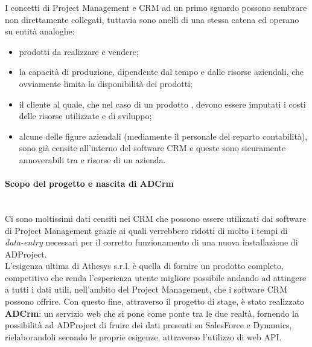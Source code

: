 \documentclass[12pt,a4paper,twoside,openright,english]{book}
\begin{document}
	I concetti di Project Management e CRM ad un primo sguardo possono sembrare non direttamente collegati, tuttavia sono anelli di una stessa catena ed operano su entità analoghe:
	\begin{itemize}
		\itemsep-1em 
		\item prodotti da realizzare e vendere;
		\item la capacità di produzione, dipendente dal tempo e dalle risorse aziendali, che ovviamente limita la disponibilità dei prodotti;	
		\item il cliente al quale, che nel caso di un prodotto , devono essere imputati i costi delle risorse utilizzate e di sviluppo;
		\item alcune delle figure aziendali (mediamente il personale del reparto contabilità), sono già censite all'interno del software CRM e queste sono sicuramente annoverabili tra e risorse di un azienda.
	\end{itemize}
	
	\paragraph{Scopo del progetto e nascita di ADCrm}~\\
		Ci sono moltissimi dati censiti nei CRM che possono essere utilizzati dai software di Project Management grazie ai quali verrebbero ridotti di molto i tempi di \textit{data-entry} necessari per il corretto funzionamento di una nuova installazione di ADProject.\\
		L'esigenza ultima di Athesys s.r.l. è quella di fornire un prodotto completo, competitivo che renda l'esperienza utente migliore possibile andando ad attingere a tutti i dati utili, nell'ambito del Project Management, che i software CRM possono offrire. Con questo fine, attraverso il progetto di stage, è stato realizzato \textbf{ADCrm}: un servizio web che si pone come ponte tra le due realtà, fornendo la possibilità ad ADProject di fruire dei dati presenti su SalesForce e Dynamics, rielaborandoli secondo le proprie esigenze, attraverso l'utilizzo di web API.
	\par

\tableofcontents
\listoffigures
\listoftables
\mainmatter

\end{document}
